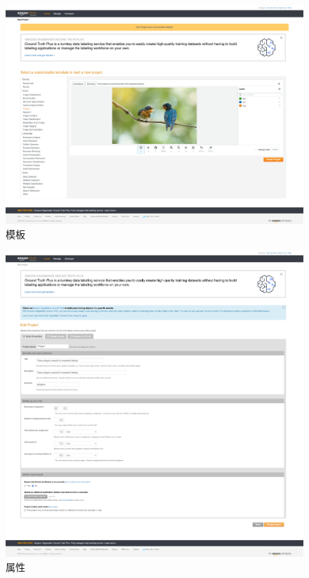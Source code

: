\begin{figure}[h!]
    \centering
    \includegraphics[width=0.9\linewidth]{imgs/template.png}
    \caption{模板}
    \label{fig:template}
\end{figure}

\newpage

\begin{figure}[h!]
    \centering
    \includegraphics[width=0.9\linewidth]{imgs/properties.png}
    \caption{属性}
    \label{fig:properties}
\end{figure}

\newpage

